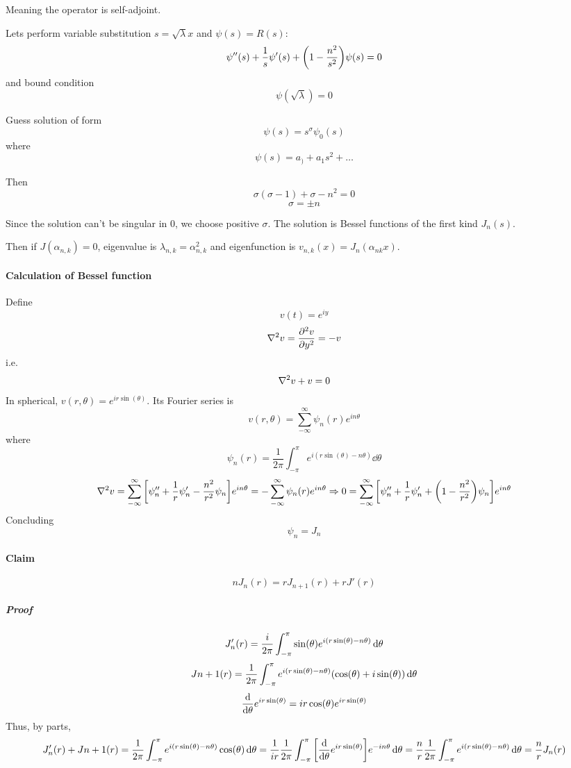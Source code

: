 Meaning the operator is self-adjoint.

Lets perform variable substitution $s=\sqrt{\lambda}x$ and $\psi(s) = R(s)$:
$$\psi''(s) +\frac{1}{s} \psi'(s) + \qty(1-\frac{n^2}{s^2})\psi(s) = 0$$
and bound condition
$$\psi(\sqrt{\lambda}) = 0$$

Guess solution of form
$$\psi(s) = s^\sigma \psi_0(s)$$ 
where
$$\psi(s) = a_) + a_1s^2 + \dots$$

Then
$$\sigma(\sigma-1) + \sigma - n^2 = 0$$
$$\sigma = \pm n$$

Since the solution can't be singular in $0$, we choose positive $\sigma$. The solution is Bessel functions of the first kind $J_n(s)$.

Then if $J(\alpha_{n,k}) = 0$, eigenvalue is $\lambda_{n,k} = \alpha^2_{n,k}$ and eigenfunction is $v_{n,k}(x) = J_{n}(\alpha_{nk} x)$.

\paragraph{Calculation of Bessel function}
Define
$$v(t)  = e^{iy}$$
$$\laplacian{v} = \pdv[2]{v}{y} = -v$$
i.e.
$$\laplacian{v} +v= 0$$
In spherical, $v(r,\theta) = e^{ir\sin(\theta)}$. Its Fourier series is
$$v(r,\theta) = \sum_{-\infty}^\infty \psi_n(r) e^{in\theta}$$
where
$$\psi_n(r) = \frac{1}{2\pi} \int_{-\pi}^\pi e^{i(r\sin(\theta) - n\theta)} \dd{\theta}$$
$$\laplacian{v} = \sum_{-\infty}^\infty \qty[\psi''_n +\frac{1}{r} \psi'_n- \frac{n^2}{r^2}\psi_n]e^{in\theta} = -\sum_{-\infty}^\infty \psi_n(r) e^{in\theta} \Rightarrow 0 =   \sum_{-\infty}^\infty \qty[\psi''_n +\frac{1}{r} \psi'_n+\qty(1-\frac{n^2}{r^2})\psi_n]e^{in\theta}  $$
Concluding
$$\psi_n = J_n$$
\paragraph{Claim}
$$nJ_n(r) = rJ_{n+1}(r) + rJ'(r)$$
\subparagraph{Proof}
$$J'_n(r) = \frac{i}{2\pi} \int_{-\pi}^\pi \sin(\theta) e^{i\qty(r\sin(\theta)-n\theta)}\dd{\theta}$$
$$J{n+1}(r) = \frac{1}{2\pi} \int_{-\pi}^\pi e^{i\qty(r\sin(\theta)-n\theta)} \qty(\cos(\theta) + i\sin(\theta))\dd{\theta}$$
$$\dv{\theta} e^{ir\sin(\theta)} = ir\cos(\theta) e^{ir\sin(\theta)} $$
Thus, by parts,
$$J'_n(r) + J{n+1}(r)  = \frac{1}{2\pi} \int_{-\pi}^\pi e^{i\qty(r\sin(\theta)-n\theta)} \cos(\theta) \dd{\theta}  = \frac{1}{ir}\frac{1}{2\pi} \int_{-\pi}^\pi \qty[\dv{\theta} e^{ir\sin(\theta)} ]e^{-in\theta} \dd{\theta} = \frac{n}{r}\frac{1}{2\pi} \int_{-\pi}^\pi e^{i(r\sin(\theta) -n\theta)} \dd{\theta} = \frac{n}{r} J_n(r)$$
